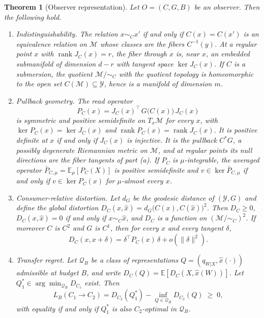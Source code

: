 \documentclass[11pt]{article}
\newtheorem{theorem}{Theorem}
\theoremstyle{definition}
\theoremstyle{remark}
\newcommand{\PC}{P_{C}}
\newcommand{\M}{\mathcal{M}}
\newcommand{\Y}{\mathcal{Y}}
\newcommand{\E}{\mathbb{E}}
\newcommand{\rank}{\operatorname{rank}}
\newcommand{\dG}{d_{G}}
\begin{document}
\begin{theorem}[Observer representation]
\label{thm:rep}
Let $O=(C,G,B)$ be an observer. Then the following hold.
\begin{enumerate}
\item[(a)] \emph{Indistinguishability.} The relation $x\sim_{C}x'$ if and only if $C(x)=C(x')$ is an equivalence relation on $\M$ whose classes are the fibers $C^{-1}(y)$. At a regular point $x$ with $\rank J_{C}(x)=r$, the fiber through $x$ is, near $x$, an embedded submanifold of dimension $d-r$ with tangent space $\ker J_{C}(x)$. If $C$ is a submersion, the quotient $\M/\!\sim_{C}$ with the quotient topology is homeomorphic to the open set $C(\M)\subseteq\Y$, hence is a manifold of dimension $m$.
\item[(b)] \emph{Pullback geometry.} The read operator
\begin{equation}
\PC(x)=J_{C}(x)^{\top}\,G\bigl(C(x)\bigr)\,J_{C}(x)
\label{eq:PC}
\end{equation}
is symmetric and positive semidefinite on $T_{x}\M$ for every $x$, with $\ker\PC(x)=\ker J_{C}(x)$ and $\rank\PC(x)=\rank J_{C}(x)$. It is positive definite at $x$ if and only if $J_{C}(x)$ is injective. It is the pullback $C^{*}G$, a possibly degenerate Riemannian metric on $\M$, and at regular points its null directions are the fiber tangents of part (a). If $\PC$ is $\mu$-integrable, the averaged operator $\bar{P}_{C,\mu}=\E_{\mu}[\PC(X)]$ is positive semidefinite and $v\in\ker\bar{P}_{C,\mu}$ if and only if $v\in\ker\PC(x)$ for $\mu$-almost every $x$.
\item[(c)] \emph{Consumer-relative distortion.} Let $\dG$ be the geodesic distance of $(\Y,G)$ and define the global distortion $D_{C}(x,\hat{x})=\dG\bigl(C(x),C(\hat{x})\bigr)^{2}$. Then $D_{C}\ge0$, $D_{C}(x,\hat{x})=0$ if and only if $x\sim_{C}\hat{x}$, and $D_{C}$ is a function on $(\M/\!\sim_{C})^{2}$. If moreover $C$ is $C^{2}$ and $G$ is $C^{1}$, then for every $x$ and every tangent $\delta$,
\begin{equation}
D_{C}(x,x+\delta)=\delta^{\top}\PC(x)\,\delta+o(\|\delta\|^{2}).
\label{eq:local}
\end{equation}
\item[(d)] \emph{Transfer regret.} Let $\mathcal{Q}_{B}$ be a class of representations $Q=(q_{W|X},\hat{x}(\cdot))$ admissible at budget $B$, and write $D_{C}(Q)=\E[D_{C}(X,\hat{x}(W))]$. Let $Q_{1}^{*}\in\arg\min_{\mathcal{Q}_{B}}D_{C_{1}}$ exist. Then
\begin{equation}
L_{B}(C_{1}\to C_{2})=D_{C_{2}}(Q_{1}^{*})-\inf_{Q\in\mathcal{Q}_{B}}D_{C_{2}}(Q)\;\ge\;0,
\label{eq:regret}
\end{equation}
with equality if and only if $Q_{1}^{*}$ is also $C_{2}$-optimal in $\mathcal{Q}_{B}$.
\end{enumerate}
\end{theorem}
\end{document}
